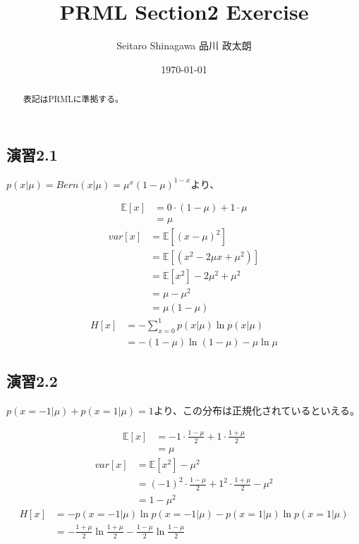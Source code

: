 \documentclass{bxjsarticle}
\title{PRML Section2 Exercise}
\author{Seitaro Shinagawa  品川 政太朗}
\date{\today}
\begin{document}
\maketitle

\begin{abstract}
表記はPRMLに準拠する。
\end{abstract}

\subsection*{演習2.1}
$p(x|\mu)=Bern(x|\mu)=\mu^x(1-\mu)^{1-x}$より、

\begin{align*}
\mathbb{E}[x]	&= 0 \cdot (1-\mu) + 1 \cdot \mu \\
				&= \mu
\end{align*}
\begin{align*}
var[x]	&= \mathbb{E}[(x-\mu)^2] \\
		&= \mathbb{E}[(x^2-2 \mu x+\mu^2)] \\
        &= \mathbb{E}[x^2]-2\mu^2+\mu^2 \\
        &= \mu-\mu^2 \\
        &= \mu(1-\mu)
\end{align*}
\begin{align*}
H[x]	&= -\sum_{x=0}^{1}{p(x|\mu)\ln p(x|\mu)} \\
		&= -(1-\mu)\ln (1-\mu)-\mu \ln \mu
\end{align*}

\subsection*{演習2.2}
$p(x=-1|\mu)+p(x=1|\mu)=1$より、この分布は正規化されているといえる。

\begin{align*}
\mathbb{E}[x]	&= -1 \cdot \frac{1-\mu}{2} + 1 \cdot \frac{1+\mu}{2} \\
				&= \mu
\end{align*}
\begin{align*}
var[x]	&= \mathbb{E}[x^2]-\mu^2 \\
        &= (-1)^2 \cdot \frac{1-\mu}{2} + 1^2 \cdot \frac{1+\mu}{2} -\mu^2 \\
        &= 1-\mu^2
\end{align*}
\begin{align*}
H[x]	&= -p(x=-1|\mu)\ln p(x=-1|\mu) - p(x=1|\mu)\ln p(x=1|\mu) \\
		&= -\frac{1+\mu}{2} \ln \frac{1+\mu}{2} - \frac{1-\mu}{2} \ln \frac{1-\mu}{2}
\end{align*}
\end{document}
